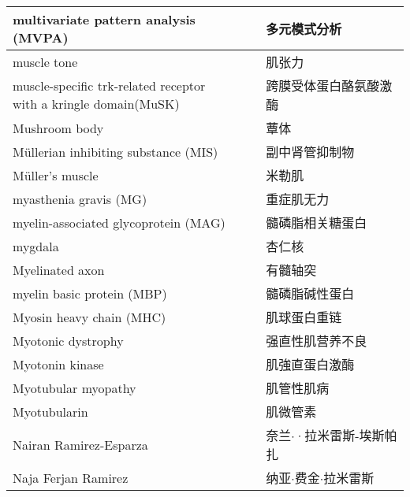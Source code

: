 \begin{longtable}{lll}
	\midrule
	multivariate pattern analysis (MVPA)  && 多元模式分析  \\
	
	\midrule
	muscle tone   && 肌张力  \\
	
	\midrule
	\makecell[l]{muscle-specific trk-related receptor \\with a kringle domain(MuSK)}   && 跨膜受体蛋白酪氨酸激酶  \\
	
	\midrule
	Mushroom body   && 蕈体  \\
	
	\midrule
	Müllerian inhibiting substance (MIS)   && 副中肾管抑制物  \\
	
	\midrule
	Müller's muscle   && 米勒肌  \\
	
	\midrule
	myasthenia gravis (MG)    && 重症肌无力   \\
	
	\midrule
	myelin-associated glycoprotein (MAG)     && 髓磷脂相关糖蛋白   \\
	
	\midrule
	mygdala     && 杏仁核   \\
	
	\midrule
	Myelinated axon     && 有髓轴突   \\
	
	\midrule
	myelin basic protein (MBP)     && 髓磷脂碱性蛋白   \\
	
	\midrule
	Myosin heavy chain (MHC)    && 肌球蛋白重链   \\
	
	\midrule
	Myotonic dystrophy    && 强直性肌营养不良   \\
	
	\midrule
	Myotonin kinase    && 肌強直蛋白激酶   \\
	
	\midrule
	Myotubular myopathy    && 肌管性肌病   \\
	
	\midrule
	Myotubularin    && 肌微管素   \\
	
	\midrule
	Nairan Ramirez-Esparza    && 奈兰$\cdot$·拉米雷斯-埃斯帕扎   \\
	
	\midrule
	Naja Ferjan Ramirez   &&  纳亚$\cdot$费金$\cdot$拉米雷斯 \\
	

\end{longtable}
